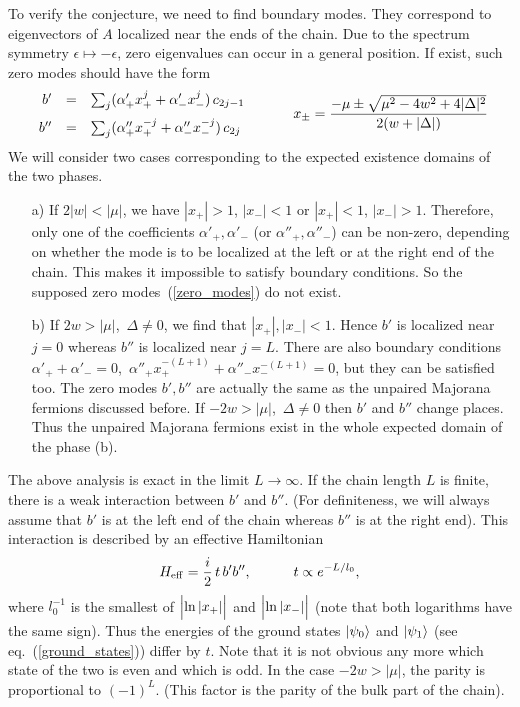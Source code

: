 To verify the conjecture, we need to find boundary modes. They correspond to
eigenvectors of $A$ localized near the ends of the chain. Due to the spectrum
symmetry $\epsilon\mapsto-\epsilon$, zero eigenvalues can occur in a general
position. If exist, such zero modes should have the form
\begin{equation}\label{zero_modes}
\begin{array}{rcl}
b'&=& \sum_j (\alpha'_{+}x_{+}^j+\alpha'_{-}x_{-}^j)\, c_{2j-1}
\medskip\\
b''&=& \sum_{j} (\alpha''_{+}x_{+}^{-j}+\alpha''_{-}x_{-}^{-j})\, c_{2j}
\end{array}
\qquad\quad
x_{\pm}=\frac{-\mu\pm\sqrt{\mu^2-4w^2+4|\Delta|^2}}{2(w+|\Delta|)}
\end{equation}
We will consider two cases corresponding to the expected existence domains of
the two phases.
\begin{itemize}
\item[a)] If $2|w|<|\mu|$, we have $|x_+|>1$, $|x_-|<1$ or $|x_+|<1$,
$|x_-|>1$. Therefore, only one of the coefficients $\alpha'_{+},\alpha'_{-}$
(or $\alpha''_{+},\alpha''_{-}$) can be non-zero, depending on whether the
mode is to be localized at the left or at the right end of the chain. This
makes it impossible to satisfy boundary conditions. So the supposed zero
modes~(\ref{zero_modes}) do not exist.
\item[b)] If $2w>|\mu|$,\, $\Delta\not=0$, we find that $|x_+|,|x_-|<1$. Hence
$b'$ is localized near $j=0$ whereas $b''$ is localized near $j=L$. There are
also boundary conditions $\alpha'_{+}+\alpha'_{-}=0$,\,
$\alpha''_{+}x_{+}^{-(L+1)}+\alpha''_{-}x_{-}^{-(L+1)}=0$, but they can be
satisfied too. The zero modes $b',b''$ are actually the same as the unpaired
Majorana fermions discussed before. If $-2w>|\mu|$,\, $\Delta\not=0$ then $b'$
and $b''$ change places. Thus the unpaired Majorana fermions exist in the
whole expected domain of the phase (b).
\end{itemize}

The above analysis is exact in the limit $L\to\infty$. If the chain length $L$
is finite, there is a weak interaction between $b'$ and $b''$.  (For
definiteness, we will always assume that $b'$ is at the left end of the chain
whereas $b''$ is at the right end). This interaction is described by an
effective Hamiltonian
\begin{equation}\label{effective_Hamiltonian}
H_{\rm eff}=\frac{i}{2}\,t\,b'b'',\qquad\quad t\propto e^{-L/l_0},
\end{equation}
where $l_0^{-1}$ is the smallest of $\Bigl|\ln|x_{+}|\Bigr|$ and
$\Bigl|\ln|x_{-}|\Bigr|$ (note that both logarithms have the same sign).  Thus
the energies of the ground states $|\psi_0\rangle$ and $|\psi_1\rangle$ (see
eq.~(\ref{ground_states})) differ by $t$. Note that it is not obvious any more
which state of the two is even and which is odd. In the case $-2w>|\mu|$, the
parity is proportional to $(-1)^L$. (This factor is the parity of the bulk
part of the chain).


